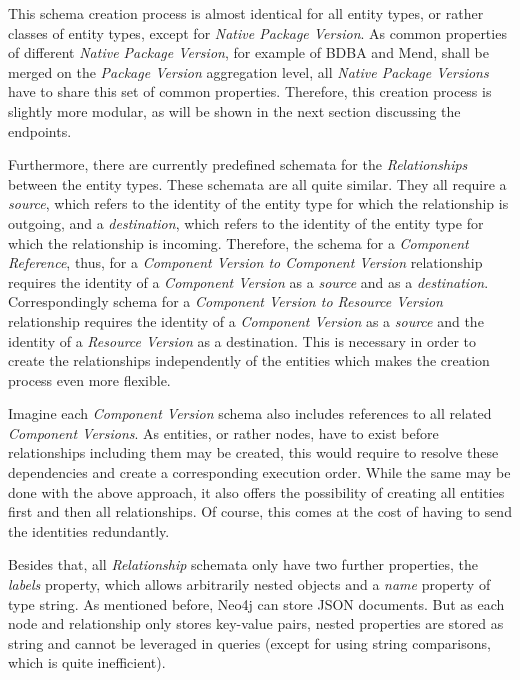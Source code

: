 This schema creation process is almost identical for all entity types, or rather classes of entity types, except for \emph{Native Package Version}. As common properties of different \emph{Native Package Version}, for example of BDBA and Mend, shall be merged on the \emph{Package Version} aggregation level, all \emph{Native Package Versions} have to share this set of common properties. Therefore, this creation process is slightly more modular, as will be shown in the next section discussing the endpoints.\par
Furthermore, there are currently predefined schemata for the \emph{Relationships} between the entity types. These schemata are all quite similar. They all require a \emph{source}, which refers to the identity of the entity type for which the relationship is outgoing, and a \emph{destination}, which refers to the identity of the entity type for which the relationship is incoming. Therefore, the schema for a \emph{Component Reference}, thus, for a \emph{Component Version to Component Version} relationship requires the identity of a \emph{Component Version} as a \emph{source} and as a \emph{destination}. Correspondingly schema for a \emph{Component Version to Resource Version} relationship requires the identity of a \emph{Component Version} as a \emph{source} and the identity of a \emph{Resource Version} as a destination. This is necessary in order to create the relationships independently of the entities which makes the creation process even more flexible.\par 
Imagine each \emph{Component Version} schema also includes references to all related \emph{Component Versions}. As entities, or rather nodes, have to exist before relationships including them may be created, this would require to resolve these dependencies and create a corresponding execution order. While the same may be done with the above approach, it also offers the possibility of creating all entities first and then all relationships. Of course, this comes at the cost of having to send the identities redundantly.\par 
Besides that, all \emph{Relationship} schemata only have two further properties, the \emph{labels} property, which allows arbitrarily nested objects and a \emph{name} property of type string. As mentioned before, Neo4j can store JSON documents. But as each node and relationship only stores key-value pairs, nested properties are stored as string and cannot be leveraged in queries (except for using string comparisons, which is quite inefficient).

